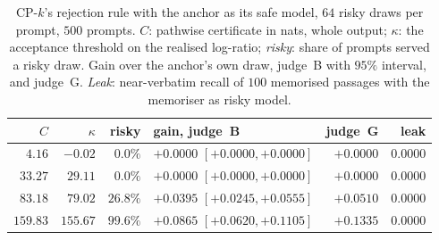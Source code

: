 \begin{table}[ht]
\centering\footnotesize
\caption{CP-$k$'s rejection rule with the anchor as its safe model, $64$ risky draws per prompt, $500$
prompts. $C$: pathwise certificate in nats, whole output; $\kappa$: the acceptance threshold on the
realised log-ratio; \emph{risky}: share of prompts served a risky draw. Gain over the anchor's own draw,
judge~B with $95\%$ interval, and judge~G. \emph{Leak}: near-verbatim recall of $100$ memorised passages
with the memoriser as risky model.}\label{tab:cpk}
\setlength{\tabcolsep}{4pt}
\begin{tabular}{@{}rrrlrr@{}}
\toprule
$C$ & $\kappa$ & risky & gain, judge~B & judge~G & leak \\
\midrule
$4.16$ & $-0.02$ & $0.0\%$ & $+0.0000$ $[+0.0000, +0.0000]$ & $+0.0000$ & $0.0000$ \\
$33.27$ & $29.11$ & $0.0\%$ & $+0.0000$ $[+0.0000, +0.0000]$ & $+0.0000$ & $0.0000$ \\
$83.18$ & $79.02$ & $26.8\%$ & $+0.0395$ $[+0.0245, +0.0555]$ & $+0.0510$ & $0.0000$ \\
$159.83$ & $155.67$ & $99.6\%$ & $+0.0865$ $[+0.0620, +0.1105]$ & $+0.1335$ & $0.0000$ \\
\bottomrule
\end{tabular}
\end{table}

